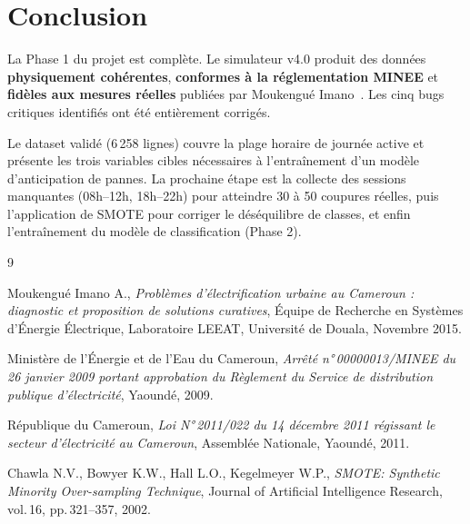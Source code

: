 \documentclass[12pt,a4paper]{article}
\begin{document}
\section{Conclusion}

La Phase 1 du projet est complète. Le simulateur v4.0 produit des données
\textbf{physiquement cohérentes}, \textbf{conformes à la réglementation MINEE}
et \textbf{fidèles aux mesures réelles} publiées par Moukengué Imano~\cite{moukengue}.
Les cinq bugs critiques identifiés ont été entièrement corrigés.

Le dataset validé (6\,258 lignes) couvre la plage horaire de journée active et
présente les trois variables cibles nécessaires à l'entraînement d'un modèle
d'anticipation de pannes. La prochaine étape est la collecte des sessions manquantes
(08h–12h, 18h–22h) pour atteindre 30 à 50 coupures réelles, puis l'application
de SMOTE pour corriger le déséquilibre de classes, et enfin l'entraînement du
modèle de classification (Phase 2).

\begin{thebibliography}{9}

  Moukengué Imano A.,
  \textit{Problèmes d'électrification urbaine au Cameroun : diagnostic et proposition
  de solutions curatives},
  Équipe de Recherche en Systèmes d'Énergie Électrique, Laboratoire LEEAT,
  Université de Douala, Novembre 2015.

  Ministère de l'Énergie et de l'Eau du Cameroun,
  \textit{Arrêté n°\,00000013/MINEE du 26 janvier 2009 portant approbation du
  Règlement du Service de distribution publique d'électricité},
  Yaoundé, 2009.

  République du Cameroun,
  \textit{Loi N°\,2011/022 du 14 décembre 2011 régissant le secteur d'électricité
  au Cameroun},
  Assemblée Nationale, Yaoundé, 2011.

  Chawla N.V., Bowyer K.W., Hall L.O., Kegelmeyer W.P.,
  \textit{SMOTE: Synthetic Minority Over-sampling Technique},
  Journal of Artificial Intelligence Research, vol.\,16, pp.\,321--357, 2002.

\end{thebibliography}
\end{document}
